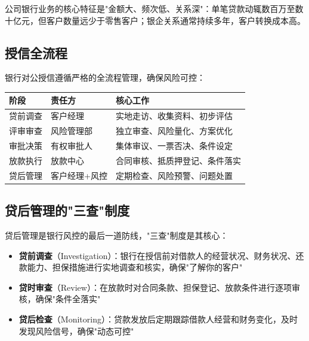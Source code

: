 公司银行业务的核心特征是"金额大、频次低、关系深"：单笔贷款动辄数百万至数十亿元，但客户数量远少于零售客户；银企关系通常持续多年，客户转换成本高。

\subsection{授信全流程}

银行对公授信遵循严格的全流程管理，确保风险可控：

\begin{table}[H]
\centering
\begin{tabular}{lp{3cm}p{6cm}}
\toprule
\textbf{阶段} & \textbf{责任方} & \textbf{核心工作} \\
\midrule
贷前调查 & 客户经理 & 实地走访、收集资料、初步评估 \\
评审审查 & 风险管理部 & 独立审查、风险量化、方案优化 \\
审批决策 & 有权审批人 & 集体审议、一票否决、条件设定 \\
放款执行 & 放款中心 & 合同审核、抵质押登记、条件落实 \\
贷后管理 & 客户经理+风控 & 定期检查、风险预警、问题处置 \\
\bottomrule
\end{tabular}
\end{table}

\subsection{贷后管理的"三查"制度}

贷后管理是银行风控的最后一道防线，"三查"制度是其核心：

\begin{itemize}[leftmargin=2em]
  \item \textbf{贷前调查}（Investigation）：银行在授信前对借款人的经营状况、财务状况、还款能力、担保措施进行实地调查和核实，确保"了解你的客户"
  \item \textbf{贷时审查}（Review）：在放款时对合同条款、担保登记、放款条件进行逐项审核，确保"条件全落实"
  \item \textbf{贷后检查}（Monitoring）：贷款发放后定期跟踪借款人经营和财务变化，及时发现风险信号，确保"动态可控"
\end{itemize}


